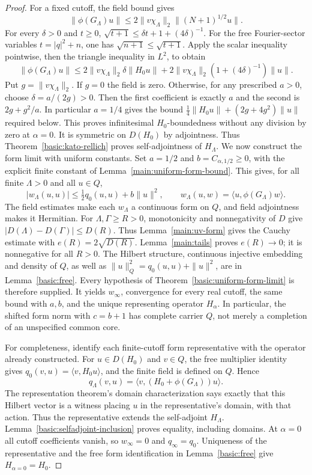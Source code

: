 \documentclass[11pt,a4paper]{article}
\theoremstyle{definition}
\theoremstyle{remark}
\begin{document}
\begin{proof}
For a fixed cutoff, the field bound gives
\[
 \|\phi(G_\Lambda)u\|\leq2\|v\chi_\Lambda\|_2
                                     \|(N+1)^{1/2}u\|.
\]
For every $\delta>0$ and $t\geq0$,
$\sqrt{t+1}\leq\delta t+1+(4\delta)^{-1}$. For the free Fourier-sector variables $t=|q|^2+n$, one has
$\sqrt{n+1}\leq\sqrt{t+1}$. Apply the scalar inequality pointwise,
then the triangle inequality in $L^2$, to obtain
\[
 \|\phi(G_\Lambda)u\|
 \leq2\|v\chi_\Lambda\|_2\delta\|H_0u\|
   +2\|v\chi_\Lambda\|_2(1+(4\delta)^{-1})\|u\|.
\]
Put $g=\|v\chi_\Lambda\|_2$. If $g=0$ the field is zero.
Otherwise, for any prescribed $a>0$, choose $\delta=a/(2g)>0$.
Then the first coefficient is exactly $a$ and the second is
$2g+g^2/a$. In particular $a=1/4$ gives the bound
$\frac14\|H_0u\|+(2g+4g^2)\|u\|$ required below.
This proves infinitesimal $H_0$-boundedness without
any division by zero at $\alpha=0$. It is symmetric on $D(H_0)$ by adjointness. Thus
Theorem~\ref{basic:kato-rellich} proves self-adjointness of $H_\Lambda$.
We now construct the form limit with uniform constants.
Set $a=1/2$ and $b=C_{\alpha,1/2}\geq0$, with the explicit finite
constant of Lemma~\ref{main:uniform-form-bound}. This gives, for
all finite $\Lambda>0$ and all $u\in Q$,
\[
 |w_\Lambda(u,u)|\leq\tfrac12 q_0(u,u)+b\|u\|^2,
 \qquad w_\Lambda(u,w)=\langle u,\phi(G_\Lambda)w\rangle.
\]
The field estimates make each $w_\Lambda$ a continuous form on
$Q$, and field adjointness makes it Hermitian. For $\Lambda,\Gamma\geq R>0$,
monotonicity and nonnegativity of $D$ give
$|D(\Lambda)-D(\Gamma)|\leq D(R)$. Thus Lemma~\ref{main:uv-form}
gives the Cauchy estimate with $e(R)=2\sqrt{D(R)}$.
Lemma~\ref{main:tails} proves $e(R)\to0$; it is nonnegative for all
$R>0$. The Hilbert structure, continuous injective embedding and
density of $Q$, as well as
$\|u\|_Q^2=q_0(u,u)+\|u\|^2$, are in Lemma~\ref{basic:free}.
Every hypothesis of Theorem~\ref{basic:uniform-form-limit} is
therefore supplied. It yields $w_\infty$, convergence for every
real cutoff, the same bound with $a,b$, and the unique representing
operator $H_\alpha$. In particular, the shifted form norm with
$c=b+1$ has complete carrier $Q$, not merely a completion of an
unspecified common core.

For completeness, identify each finite-cutoff form representative
with the operator already constructed. For $u\in D(H_0)$ and
$v\in Q$, the free multiplier identity gives
$q_0(v,u)=\langle v,H_0u\rangle$, and the finite field is defined
on $Q$. Hence
\[
 q_\Lambda(v,u)=\langle v,(H_0+\phi(G_\Lambda))u\rangle.
\]
The representation theorem's domain characterization says exactly
that this Hilbert vector is a witness placing $u$ in the
representative's domain, with that action. Thus the representative
extends the self-adjoint $H_\Lambda$. Lemma~\ref{basic:selfadjoint-inclusion}
proves equality, including domains.
At $\alpha=0$ all cutoff coefficients vanish, so
$w_\infty=0$ and $q_\infty=q_0$. Uniqueness of the representative
and the free form identification in Lemma~\ref{basic:free} give
$H_{\alpha=0}=H_0$.
\end{proof}
\end{document}
